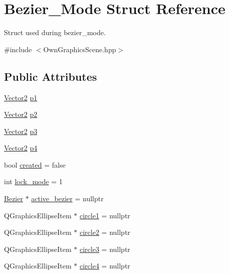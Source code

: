 \hypertarget{structBezier__Mode}{}\section{Bezier\+\_\+\+Mode Struct Reference}
\label{structBezier__Mode}


Struct used during bezier\+\_\+mode.  




{\ttfamily \#include $<$Own\+Graphics\+Scene.\+hpp$>$}

\subsection*{Public Attributes}
\begin{DoxyCompactItemize}
\item 
\mbox{\hyperlink{classVector2}{Vector2}} \mbox{\hyperlink{structBezier__Mode_a2d7c5ccccb03114fd1b26a20843a59e4}{p1}}
\item 
\mbox{\hyperlink{classVector2}{Vector2}} \mbox{\hyperlink{structBezier__Mode_a96ed0f4076e540e5a8789f25f9bf65e9}{p2}}
\item 
\mbox{\hyperlink{classVector2}{Vector2}} \mbox{\hyperlink{structBezier__Mode_ad9fbff84a5248923ceb29433dc58f49b}{p3}}
\item 
\mbox{\hyperlink{classVector2}{Vector2}} \mbox{\hyperlink{structBezier__Mode_a5a3df46137ba62eaf3f9c0ad1ee391ef}{p4}}
\item 
bool \mbox{\hyperlink{structBezier__Mode_ae2573f8601e7d9f439d2bfbc11c34ae9}{created}} = false
\item 
int \mbox{\hyperlink{structBezier__Mode_afdb33ea2b7dc22c264580b86e5e9e998}{lock\+\_\+mode}} = 1
\item 
\mbox{\hyperlink{classBezier}{Bezier}} $\ast$ \mbox{\hyperlink{structBezier__Mode_a9aefbd869ef59854732e405886d334fb}{active\+\_\+bezier}} = nullptr
\item 
Q\+Graphics\+Ellipse\+Item $\ast$ \mbox{\hyperlink{structBezier__Mode_ab07833315488dc0d3c6f613c51de1d3f}{circle1}} = nullptr
\item 
Q\+Graphics\+Ellipse\+Item $\ast$ \mbox{\hyperlink{structBezier__Mode_a3f6f2bdade3db15c0855820d86a5b98e}{circle2}} = nullptr
\item 
Q\+Graphics\+Ellipse\+Item $\ast$ \mbox{\hyperlink{structBezier__Mode_a342d3b970c6049b615ef356a902c0781}{circle3}} = nullptr
\item 
Q\+Graphics\+Ellipse\+Item $\ast$ \mbox{\hyperlink{structBezier__Mode_a6f26e1fe7da425063b792dab9f3c1099}{circle4}} = nullptr
\end{DoxyCompactItemize}



